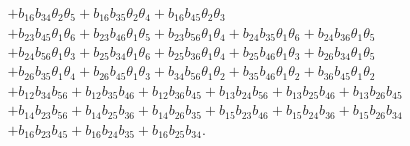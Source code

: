 \begin{frame}
\[\begin{array}{l}
+b_{{16}}b_{{34}}\theta_{{2}}\theta_{{5}}
+b_{{16}}b_{{35}}\theta_{{2}}\theta_{{4}}
+b_{{16}}b_{{45}}\theta_{{2}}\theta_{{3}}\\
+b_{{23}}b_{{45}}\theta_{{1}}\theta_{{6}}
+b_{{23}}b_{{46}}\theta_{{1}}\theta_{{5}}
+b_{{23}}b_{{56}}\theta_{{1}}\theta_{{4}}
+b_{{24}}b_{{35}}\theta_{{1}}\theta_{{6}}
+b_{{24}}b_{{36}}\theta_{{1}}\theta_{{5}}\\
+b_{{24}}b_{{56}}\theta_{{1}}\theta_{{3}}
+b_{{25}}b_{{34}}\theta_{{1}}\theta_{{6}}
+b_{{25}}b_{{36}}\theta_{{1}}\theta_{{4}}
+b_{{25}}b_{{46}}\theta_{{1}}\theta_{{3}}
+b_{{26}}b_{{34}}\theta_{{1}}\theta_{{5}}\\
+b_{{26}}b_{{35}}\theta_{{1}}\theta_{{4}}
+b_{{26}}b_{{45}}\theta_{{1}}\theta_{{3}}
+b_{{34}}b_{{56}}\theta_{{1}}\theta_{{2}}
+b_{{35}}b_{{46}}\theta_{{1}}\theta_{{2}}
+b_{{36}}b_{{45}}\theta_{{1}}\theta_{{2}}\\
+b_{{12}}b_{{34}}b_{{56}}
+b_{{12}}b_{{35}}b_{{46}}
+b_{{12}}b_{{36}}b_{{45}}
+b_{{13}}b_{{24}}b_{{56}}
+b_{{13}}b_{{25}}b_{{46}}
+b_{{13}}b_{{26}}b_{{45}}\\
+b_{{14}}b_{{23}}b_{{56}}
+b_{{14}}b_{{25}}b_{{36}}
+b_{{14}}b_{{26}}b_{{35}}
+b_{{15}}b_{{23}}b_{{46}}
+b_{{15}}b_{{24}}b_{{36}}
+b_{{15}}b_{{26}}b_{{34}}\\
+b_{{16}}b_{{23}}b_{{45}}
+b_{{16}}b_{{24}}b_{{35}}
+b_{{16}}b_{{25}}b_{{34}} .
\end{array}
\]
\end{frame}


